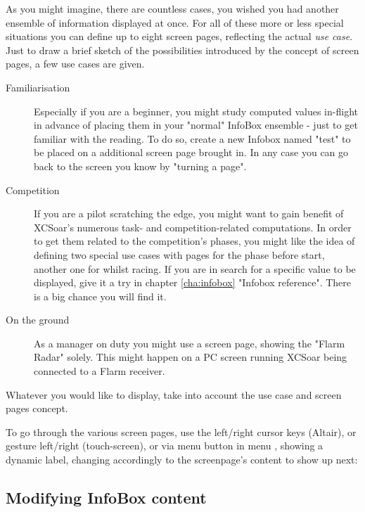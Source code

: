 As you might imagine, there are countless cases, you wished you had another 
ensemble of information displayed at once.  For all of these more or less 
special situations you can define up to eight screen pages, reflecting the 
actual \emph{use case}. Just to draw a brief sketch of the possibilities 
introduced by the concept of screen pages, a few use cases are given. 
\label{par:use_case}
\begin{description}
\item[Familiarisation] Especially if you are a beginner, you might study 
computed values in-flight in advance of placing them in your "normal" InfoBox 
ensemble - just to get familiar with the reading. To do so, create a new 
Infobox named "test" to be placed on a additional screen page brought in. In 
any case you can go back to the screen you know by "turning a page".
\item[Competition] If you are a pilot scratching the edge, you might want to 
gain benefit of XCSoar's numerous task- and competition-related computations. 
In order to get them related to the competition's phases, you might like the 
idea of defining two special use cases with pages for the phase before start, 
another one for whilst racing.  If you are in search for a specific value to 
be displayed, give it a try in chapter \ref{cha:infobox} "Infobox reference". 
There is a big chance you will find it.
\item[On the ground] As a manager on duty you might use a screen page, showing 
the "Flarm Radar" solely.  This might happen on a PC screen running XCSoar 
being connected to a Flarm receiver.
\end{description}

Whatever you would like to display, take into account the use case and screen 
pages concept.

To go through the various screen pages, use the left/right cursor 
keys (Altair), or gesture left/right (touch-screen), or via menu button in menu , showing a dynamic label, changing accordingly to the screenpage's content to show up next:

\blink{}\blink{}\blink{}\blink{}


\subsection*{Modifying InfoBox content}

